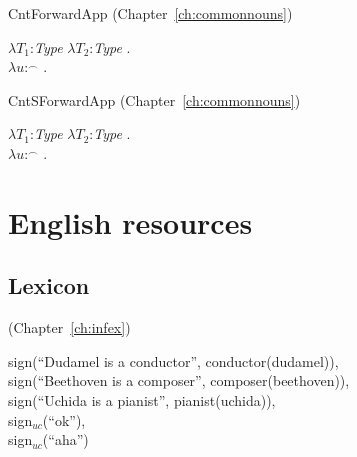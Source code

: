 CntForwardApp (Chapter~\ref{ch:commonnouns})

$\lambda T_1$:\textit{Type} $\lambda T_2$:\textit{Type} . \\
\hspace*{1em}$\lambda
u$:$^{\frown}$ . \\
\hspace*{2em}

CntSForwardApp (Chapter~\ref{ch:commonnouns})

$\lambda T_1$:\textit{Type} $\lambda T_2$:\textit{Type} . \\
\hspace*{1em}$\lambda
u$:$^{\frown}$
    . \\
\hspace*{2em} 

\section{English resources}

\subsection{Lexicon}
\label{app:lexeng}

(Chapter~\ref{ch:infex})

sign(``Dudamel is a conductor'', conductor(dudamel)), \\ 
sign(``Beethoven
is a composer'', composer(beethoven)), \\
sign(``Uchida is a
pianist'', pianist(uchida)), \\
sign$_{\mathit{uc}}$(``ok''), \\
sign$_{\mathit{uc}}$(``aha'')

